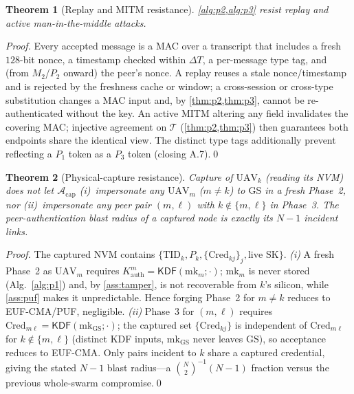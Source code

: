 \documentclass[11pt]{article}
\theoremstyle{plain}
\newtheorem{theorem}{Theorem}
\theoremstyle{definition}
\newcommand{\GS}{\mathrm{GS}}
\newcommand{\UAV}{\mathrm{UAV}}
\newcommand{\TID}{\mathrm{TID}}
\newcommand{\Cred}{\mathrm{Cred}}
\newcommand{\mk}{\mathrm{mk}}
\newcommand{\SK}{\mathrm{SK}}
\newcommand{\KDF}{\mathsf{KDF}}
\newcommand{\adv}{\mathcal{A}}
\newcommand{\transcript}{\mathcal{T}}
\begin{document}
\begin{theorem}[Replay and MITM resistance]\label{thm:replay}
\cref{alg:p2,alg:p3} resist replay and active man-in-the-middle attacks.
\end{theorem}
\begin{proof}
Every accepted message is a MAC over a transcript that includes a fresh
$128$-bit nonce, a timestamp checked within $\Delta T$, a per-message type
tag, and (from $M_2$/$P_2$ onward) the peer's nonce. A replay reuses a stale
nonce/timestamp and is rejected by the freshness cache or window; a
cross-session or cross-type substitution changes a MAC input and, by
\cref{thm:p2,thm:p3}, cannot be re-authenticated without the key. An active
MITM altering any field invalidates the covering MAC; injective agreement on
$\transcript$ (\cref{thm:p2,thm:p3}) then guarantees both endpoints share
the identical view. The distinct type tags additionally prevent reflecting a
$P_1$ token as a $P_3$ token (closing A.7).\qed
\end{proof}

\begin{theorem}[Physical-capture resistance]\label{thm:capture}
Capture of $\UAV_k$ (reading its NVM) does not let $\adv_{\mathrm{cap}}$
(i)~impersonate any $\UAV_m$ ($m\ne k$) to $\GS$ in a fresh Phase~2, nor
(ii)~impersonate any peer pair $(m,\ell)$ with $k\notin\{m,\ell\}$ in
Phase~3. The peer-authentication blast radius of a captured node is exactly
its $N-1$ incident links.
\end{theorem}
\begin{proof}
The captured NVM contains $\{\TID_k,P_k,\{\Cred_{kj}\}_j,\text{live }
\SK\}$. \emph{(i)} A fresh Phase~2 as $\UAV_m$ requires $K^{m}_{\mathrm{auth}}
=\KDF(\mk_m;\cdot)$; $\mk_m$ is never stored (Alg.~\ref{alg:p1}) and, by
\cref{ass:tamper}, is not recoverable from $k$'s silicon, while
\cref{ass:puf} makes it unpredictable. Hence forging Phase~2 for $m\ne k$
reduces to EUF-CMA/PUF, negligible. \emph{(ii)} Phase~3 for $(m,\ell)$
requires $\Cred_{m\ell}=\KDF(\mk_{\GS};\cdot)$; the captured set
$\{\Cred_{kj}\}$ is independent of $\Cred_{m\ell}$ for $k\notin\{m,\ell\}$
(distinct KDF inputs, $\mk_{\GS}$ never leaves $\GS$), so acceptance reduces
to EUF-CMA. Only pairs incident to $k$ share a captured credential, giving
the stated $N-1$ blast radius---a $\binom{N}{2}^{-1}(N-1)$ fraction versus
the previous whole-swarm compromise.\qed
\end{proof}
\end{document}
